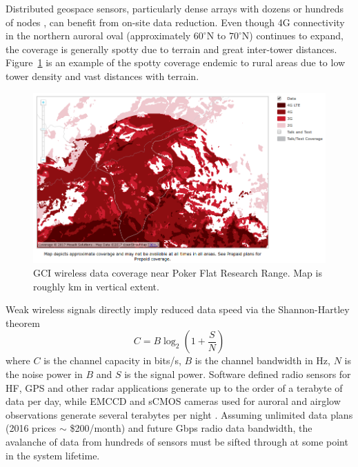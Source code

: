 Distributed geospace sensors, particularly dense arrays with dozens or hundreds of nodes \citep{pankratius2014}, can benefit from on-site data reduction.
Even though 4G connectivity in the northern auroral oval (approximately $60^\circ$N to $70^\circ$N) continues to expand, the coverage is generally spotty due to terrain and great inter-tower distances.
Figure~\ref{fig:gci} is an example of the spotty coverage endemic to rural areas due to low tower density and vast distances with terrain.
\begin{figure}\centering
	\includegraphics[width=\linewidth,trim=0 45 0 0,clip]{gfx/gci4g-pfrr}
	\caption{GCI wireless data coverage near Poker Flat Research Range. Map is roughly \unit[30]{km} in vertical extent.}\label{fig:gci}
\end{figure}
Weak wireless signals directly imply reduced data speed via the Shannon-Hartley theorem \citep{nyquist1924,hartley1928,shannon1948a,shannon1948b,lee1990}
\begin{equation}\label{eq:shannon}
C = B \log_2\left(1+\frac{S}{N}\right)
\end{equation}
where $C$ is the channel capacity in bits/s, $B$ is the channel bandwidth in Hz, $N$ is the noise power in $B$ and $S$ is the signal power. 
Software defined radio sensors for HF, GPS and other radar applications generate up to the order of a terabyte of data per day, while EMCCD and sCMOS cameras used for auroral and airglow observations generate several terabytes per night \citep{hirsch2016}.
Assuming unlimited data plans (2016 prices $\sim$ \$200/month) and future \unit[1]{Gbps} radio data bandwidth, the avalanche of data from hundreds of sensors must be sifted through at some point in the system lifetime.


